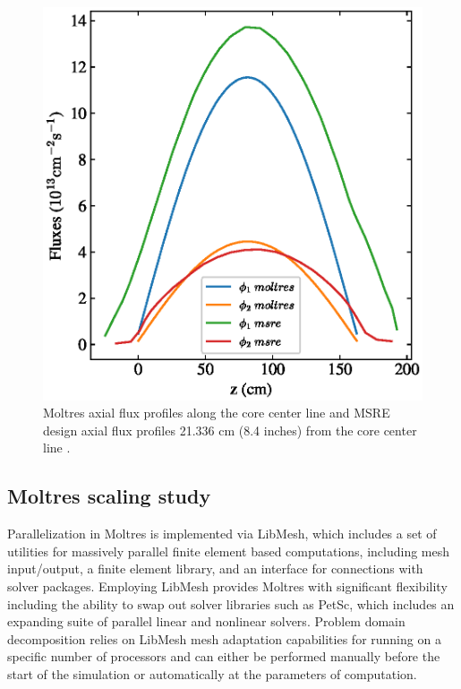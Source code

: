 \documentclass{anstrans}
\begin{document}
\begin{figure}[htpb]
    \centering
    \includegraphics[width=\linewidth]{combined_msre_moltres_axial.eps}
    \caption{Moltres axial flux profiles along the core center line and \gls{MSRE}
    design axial flux profiles 21.336 cm (8.4 inches) from the core center line \cite[p. 91]{briggs_molten-salt_1964}.}
    \label{fig:axial_fluxes_compare}
\end{figure}

\subsection{Moltres scaling study}
Parallelization in Moltres is implemented via LibMesh, which includes a set of
utilities for massively parallel finite element based computations, including
mesh input/output, a finite element library, and an interface for connections with
solver packages. Employing LibMesh provides Moltres with
significant flexibility including the ability to swap out solver libraries
such as PetSc, which includes an expanding suite of parallel linear and
nonlinear solvers. Problem domain decomposition relies on LibMesh mesh
adaptation capabilities for running on a specific number of processors and
can either be performed manually before the start of the simulation or
automatically at the parameters of computation.
\end{document}
